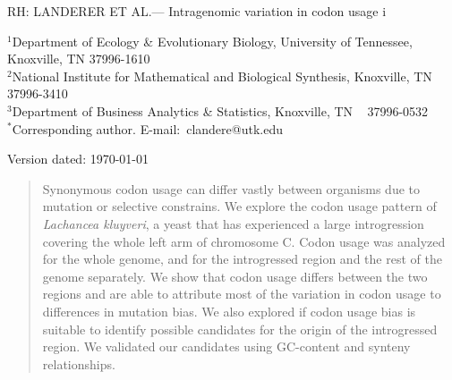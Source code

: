\documentclass[12pt,draft]{article}
\begin{document}
\doublespacing
\linenumbers



\noindent RH: LANDERER ET AL.--- Intragenomic variation in codon usage
i
\bigskip
\medskip
\begin{center}

\bigskip





\end{center}

\vfill

{\small
\noindent$^{1}$Department of Ecology \& Evolutionary Biology, University of Tennessee, Knoxville, TN 37996-1610\\
\noindent$^{2}$National Institute for Mathematical and Biological Synthesis, Knoxville, TN 37996-3410\\
\noindent$^{3}$Department of Business Analytics \& Statistics, Knoxville, TN ~ 37996-0532 \\
\noindent$^{*}$Corresponding author. E-mail:~clandere@utk.edu
}

\vfill
\centerline{Version dated: \today}
\vfill
\newpage

\begin{abstract}
Synonymous codon usage can differ vastly between organisms due to mutation or selective constrains. 
We explore the codon usage pattern of \textit{Lachancea kluyveri}, a yeast that has experienced a large introgression covering the whole left arm of chromosome C.
Codon usage was analyzed for the whole genome, and for the introgressed region and the rest of the genome separately.
We show that codon usage differs between the two regions and are able to attribute most of the variation in codon usage to differences in mutation bias.
We also explored if codon usage bias is suitable to identify possible candidates for the origin of the introgressed region.
We validated our candidates using GC-content and synteny relationships.
\end{abstract}
\end{document}
